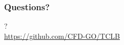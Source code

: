 \documentclass[10pt,handout]{beamer}
\begin{document}




\begin{frame}\frametitle{Questions?}
\begin{center}
{\huge ? \\}
\vfill
\url{https://github.com/CFD-GO/TCLB}
\end{center}
\end{frame}




\end{document}
